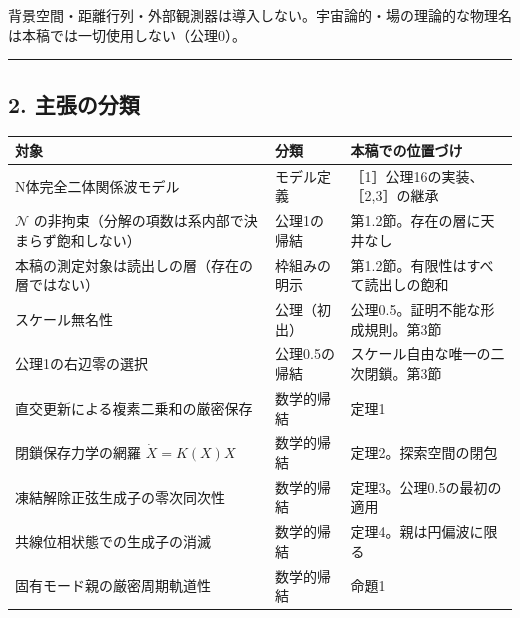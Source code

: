 \documentclass[
  a4paper,
]{ltjsarticle}
\newcounter{none} %
\begin{document}
背景空間・距離行列・外部観測器は導入しない。宇宙論的・場の理論的な物理名は本稿では一切使用しない（公理0）。

\begin{center}\rule{0.5\linewidth}{0.5pt}\end{center}

\subsection{2. 主張の分類}\label{ux4e3bux5f35ux306eux5206ux985e}

{\def\LTcaptype{none} %
\begin{longtable}[]{@{}
  >{\raggedright\arraybackslash}p{}
  >{\raggedright\arraybackslash}p{}
  >{\raggedright\arraybackslash}p{}@{}}
\toprule\noalign{}
\begin{minipage}[b]{\linewidth}\raggedright
対象
\end{minipage} & \begin{minipage}[b]{\linewidth}\raggedright
分類
\end{minipage} & \begin{minipage}[b]{\linewidth}\raggedright
本稿での位置づけ
\end{minipage} \\
\midrule\noalign{}
\endhead
\bottomrule\noalign{}
\endlastfoot
N体完全二体関係波モデル & モデル定義 &
［1］公理16の実装、［2,3］の継承 \\
\(\mathcal N\) の非拘束（分解の項数は系内部で決まらず飽和しない） &
公理1の帰結 & 第1.2節。存在の層に天井なし \\
本稿の測定対象は読出しの層（存在の層ではない） & 枠組みの明示 &
第1.2節。有限性はすべて読出しの飽和 \\
スケール無名性 & 公理（初出） & 公理0.5。証明不能な形成規則。第3節 \\
公理1の右辺零の選択 & 公理0.5の帰結 &
スケール自由な唯一の二次閉鎖。第3節 \\
直交更新による複素二乗和の厳密保存 & 数学的帰結 & 定理1 \\
閉鎖保存力学の網羅 \(\dot X=K(X)X\) & 数学的帰結 &
定理2。探索空間の閉包 \\
凍結解除正弦生成子の零次同次性 & 数学的帰結 &
定理3。公理0.5の最初の適用 \\
共線位相状態での生成子の消滅 & 数学的帰結 & 定理4。親は円偏波に限る \\
固有モード親の厳密周期軌道性 & 数学的帰結 & 命題1 \\

\end{longtable}}
\end{document}
